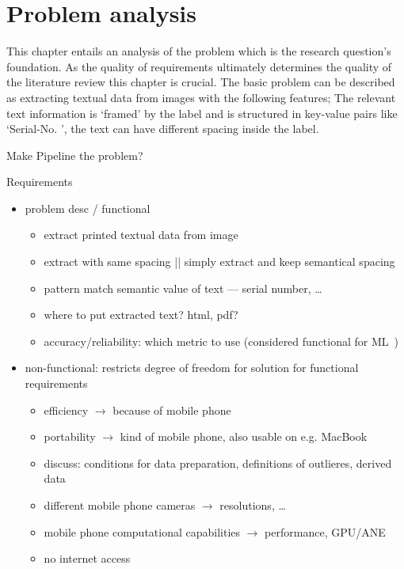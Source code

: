 \chapter{Problem analysis}\label{ch:problem}
This chapter entails an analysis of the problem which is the research question's foundation.
As the quality of requirements ultimately determines the quality of the literature review this
chapter is crucial.
The basic problem can be described as extracting textual data from images with the following
features; The relevant text information is `framed' by the label and is structured in key-value
pairs like `Serial-No. ', the text can have different spacing inside the label.

Make Pipeline the problem?

Requirements
\begin{itemize}
    \item problem desc / functional
        \begin{itemize}
            \item extract printed textual data from image
            \item extract with same spacing || simply extract and keep semantical spacing
            \item pattern match semantic value of text --- serial number, \ldots
            \item where to put extracted text? html, pdf?
            \item accuracy/reliability: which metric to use (considered functional for
                ML~\cite{vogelsang_requirements_2019})
        \end{itemize}
    \item non-functional: restricts degree of freedom for solution for functional requirements
        \begin{itemize}
            \item efficiency $\rightarrow$ because of mobile phone
            \item portability $\rightarrow$ kind of mobile phone, also usable on e.g. MacBook
            \item discuss: conditions for data preparation, definitions of outlieres,
                derived data
            \item different mobile phone cameras $\rightarrow$ resolutions, \ldots
            \item mobile phone computational capabilities
                $\rightarrow$ performance, GPU/ANE
            \item no internet access

\end{itemize}
\end{itemize}
